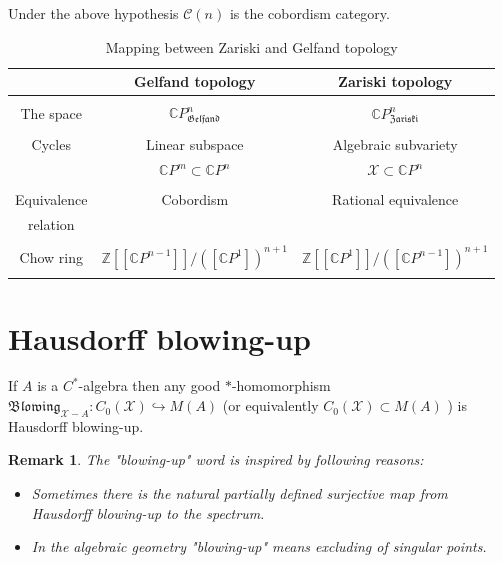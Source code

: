 \documentclass{beamer}
\theoremstyle{plain}
\newtheorem{rem}{Remark}
\newcommand{\Z}{\mathbb{Z}}
\newcommand{\C}{\mathbb{C}}
\newcommand{\sX}{\mathcal{X}}       %
\newcommand{\hookto}{\hookrightarrow}        %
\begin{document}
\begin{frame}
\begin{lemma}
	Under the above hypothesis  $\mathscr{C}\left(n \right)$ is the cobordism category.
\end{lemma}

\begin {table}[H]
\caption {Mapping between Zariski and Gelfand topology } \label{main_mapping_table} 
	\begin{tabular}{|c|c|c|}
		\hline
		&	 Gelfand topology &  Zariski topology\\
		\hline
		& & 	\\
		The space & $\C P^n_{\mathfrak{Gelfand}}$ &  $\C P^n_{\mathfrak{Zariski}}$ \\
		&&	\\
		Cycles 	&	Linear subspace  & Algebraic subvariety \\
		& $\C P^m \subset \C P^n$ & $\sX \subset \C P^n$	\\
		& &\\
		Equivalence  & Cobordism & Rational equivalence\\
	relation	&& \\
	&& \\
		Chow ring	& $\Z\left[\left[\C P^{n-1}\right]\right] /\left( \left[\C P^1\right] \right)^{n+1}$	& $\Z\left[\left[\C P^1\right]\right] /\left( \left[\C P^{n-1}\right] \right)^{n+1}$\\
		&& \\
		\hline
	\end{tabular}
\end {table}
\end{frame}


\section{Hausdorff blowing-up}
\begin{frame}
	\begin{definition}\label{blowing_defn}
	If $A$ is a $C^*$-algebra then any good $*$-homomorphism  $\mathfrak {Blowing}_{\sX-A }:C_0\left( \sX\right) \hookto M\left(A \right)$  (or equivalently $C_0\left( \sX\right) \subset M\left(A \right)$ ) is \alert{Hausdorff blowing-up}.
\end{definition}
	\begin{rem}
The "blowing-up" word is inspired by following reasons:
\begin{itemize}
	\item Sometimes there is  the natural partially defined  surjective  map from  Hausdorff blowing-up to the spectrum.
	\item  In the algebraic geometry   "blowing-up" means  excluding of singular points.
\end{itemize}
\end{rem}
\end{frame}
\end{document}
